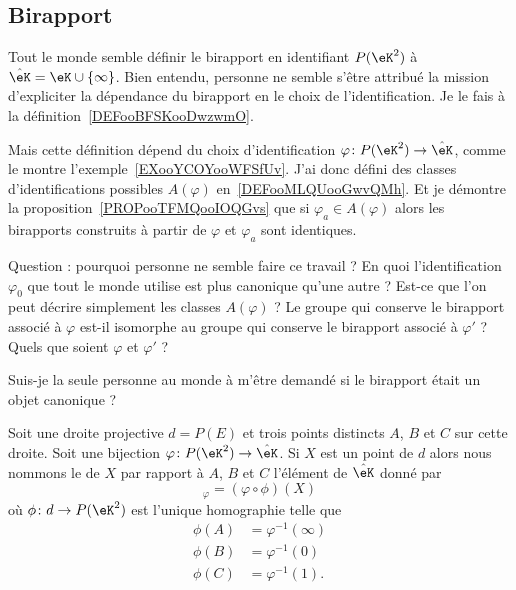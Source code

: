 \subsection{Birapport}

\begin{normaltext}
        Tout le monde semble définir le birapport en identifiant \( P(\eK^2)\) à \( \hat\eK=\eK\cup\{ \infty \}\). Bien entendu, personne ne semble s'être attribué la mission d'expliciter la dépendance du birapport en le choix de l'identification. Je le fais à la définition~\ref{DEFooBFSKooDwzwmO}.

        Mais cette définition dépend du choix d'identification \( \varphi\colon P(\eK^2)\to \hat\eK\), comme le montre l'exemple~\ref{EXooYCOYooWFSfUv}. J'ai donc défini des classes d'identifications possibles \( A(\varphi)\) en~\ref{DEFooMLQUooGwvQMh}. Et je démontre la proposition~\ref{PROPooTFMQooIOQGvs} que si \( \varphi_a\in A(\varphi)\) alors les birapports construits à partir de \( \varphi\) et \( \varphi_a\) sont identiques.

        Question : pourquoi personne ne semble faire ce travail ? En quoi l'identification \( \varphi_0\) que tout le monde utilise est plus canonique qu'une autre ? Est-ce que l'on peut décrire simplement les classes \( A(\varphi)\) ? Le groupe qui conserve le birapport associé à \( \varphi\) est-il isomorphe au groupe qui conserve le birapport associé à \( \varphi'\) ? Quels que soient \( \varphi\) et \( \varphi'\) ?

        Suis-je la seule personne au monde à m'être demandé si le birapport était un objet canonique ?
\end{normaltext}

\begin{propositionDef}      \label{DEFooBFSKooDwzwmO}
    Soit une droite projective \( d=P(E)\) et trois points distincts \( A\), \( B\) et \( C\) sur cette droite. Soit une bijection \( \varphi\colon P(\eK^2)\to \hat\eK\). Si \( X\) est un point de \( d\) alors nous nommons le  de \( X\) par rapport à \( A\), \( B\) et \( C\) l'élément de \( \hat\eK\) donné par
    \begin{equation}
        [A,B,C,X]_{\varphi}=(\varphi\circ\phi)(X)
    \end{equation}
    où \( \phi\colon d\to P(\eK^2) \) est l'unique homographie telle que
    \begin{subequations}        \label{SUBEQooYWMSooYlFKQv}
        \begin{align}
            \phi(A)&=\varphi^{-1}(\infty)\\
            \phi(B)&=\varphi^{-1}(0)\\
            \phi(C)&=\varphi^{-1}(1).
        \end{align}
    \end{subequations}
\end{propositionDef}

